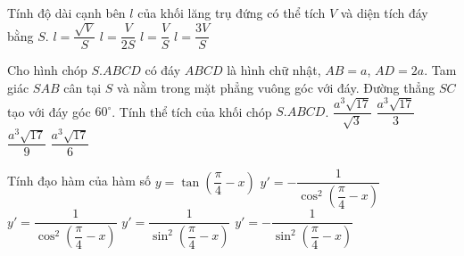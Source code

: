 \begin{ex}%
Tính độ dài cạnh bên $l$ của khối lăng trụ đứng có thể tích $V$ và diện tích đáy bằng $S$.
\choice
{$l=\dfrac{\sqrt{V}}{S}$}
{$l=\dfrac{V}{2S}$}
{\True $l=\dfrac{V}{S}$}
{$l=\dfrac{3V}{S}$}
\end{ex}

\begin{ex}%
Cho hình chóp $S.ABCD$ có đáy $ABCD$ là hình chữ nhật, $AB=a$, $AD=2a$. Tam giác $SAB$ cân tại $S$ và nằm trong mặt phẳng vuông góc với đáy. Đường thẳng $SC$ tạo với đáy góc $60^\circ$. Tính thể tích của khối chóp $S.ABCD$. 
\choice
{\True $\dfrac{a^3\sqrt{17}}{\sqrt{3}}$}
{$\dfrac{a^3\sqrt{17}}{3}$}
{$\dfrac{a^3\sqrt{17}}{9}$}
{$\dfrac{a^3\sqrt{17}}{6}$}
\end{ex}

\begin{ex}%
Tính đạo hàm của hàm số $y=\tan \left ( \dfrac{\pi}{4}-x\right )$
\choice
{\True $y' = -\dfrac{1}{\cos^2 \left ( \dfrac{\pi}{4}-x\right )}$}
{$y' = \dfrac{1}{\cos^2 \left ( \dfrac{\pi}{4}-x\right )}$}
{$y' = \dfrac{1}{\sin^2 \left ( \dfrac{\pi}{4}-x\right )}$}
{$y' = -\dfrac{1}{\sin^2 \left ( \dfrac{\pi}{4}-x\right )}$}
\end{ex}

